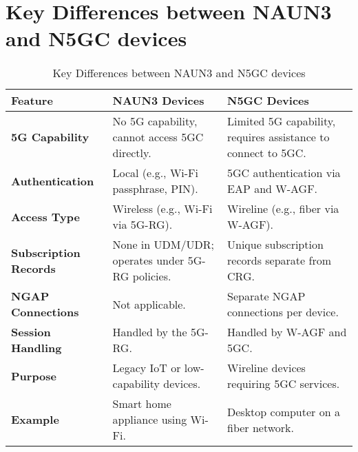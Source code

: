 \chapter{Key Differences between \acs{NAUN3} and \acs{N5GC} devices}
\begin{table}[ht]
    \centering
    \caption{Key Differences between \acs{NAUN3} and \acs{N5GC} devices}
    \label{tab:Key Differences between NAUN3 and N5GC devices}
    \begin{tabularx}{\textwidth} { 
      | >{\raggedright\arraybackslash}X 
      | >{\raggedright\arraybackslash}X 
      | >{\raggedright\arraybackslash}X | }
        \hline
        \textbf{Feature} & \textbf{\ac{NAUN3} Devices} & \textbf{\ac{N5GC} Devices} \\
        \hline
        \textbf{\ac{5G} Capability} & No \ac{5G} capability, cannot access \ac{5GC} directly. & Limited \ac{5G} capability, requires assistance to connect to \ac{5GC}.\\
        \hline
        \textbf{Authentication} & Local (e.g., Wi-Fi passphrase, \ac{PIN}). & \ac{5GC} authentication via \ac{EAP} and \ac{W-AGF}.\\
        \hline
        \textbf{Access Type} & Wireless (e.g., Wi-Fi via \ac{5G-RG}). & Wireline (e.g., fiber via \ac{W-AGF}).\\
        \hline
        \textbf{Subscription Records} & None in \ac{UDM}/\ac{UDR}; operates under \ac{5G-RG} policies. & Unique subscription records separate from \ac{CRG}.\\
        \hline
        \textbf{\ac{NGAP} Connections} & Not applicable. & Separate \ac{NGAP} connections per device.\\
        \hline
        \textbf{Session Handling} & Handled by the \ac{5G-RG}. & Handled by \ac{W-AGF} and \ac{5GC}.\\
        \hline
        \textbf{Purpose} & Legacy \ac{IoT} or low-capability devices. & Wireline devices requiring \ac{5GC} services.\\
        \hline
        \textbf{Example} & Smart home appliance using Wi-Fi. & Desktop computer on a fiber network.\\
        \hline
    \end{tabularx}
\end{table}
